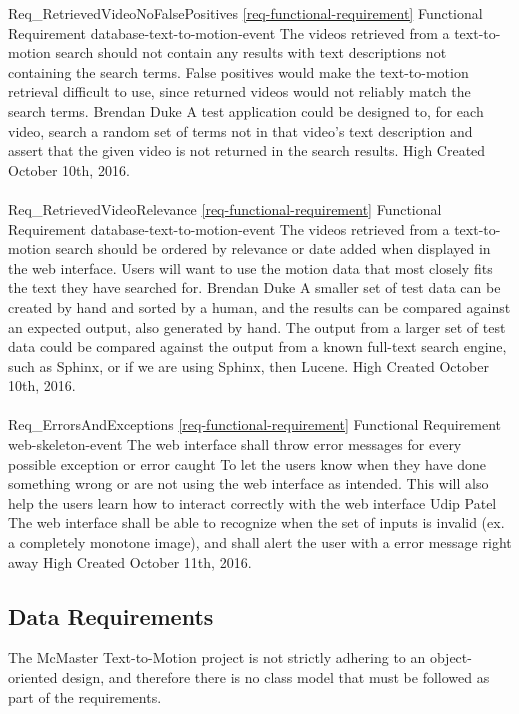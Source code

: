 \documentclass{scrreprt}
\begin{document}
\requirement
{Req_RetrievedVideoNoFalsePositives}
{\ref{req-functional-requirement} Functional Requirement}
{database-text-to-motion-event}
{The videos retrieved from a text-to-motion search should not contain any
 results with text descriptions not containing the search terms.}
{False positives would make the text-to-motion retrieval difficult to use,
 since returned videos would not reliably match the search terms.}
{Brendan Duke}
{A test application could be designed to, for each video, search a random set
 of terms not in that video's text description and assert that the given video
 is not returned in the search results.}
{High}
{Created October 10th, 2016.}
\\ \\

\requirement
{Req_RetrievedVideoRelevance}
{\ref{req-functional-requirement} Functional Requirement}
{database-text-to-motion-event}
{The videos retrieved from a text-to-motion search should be ordered by relevance or date added when displayed in the web interface.}
{Users will want to use the motion data that most closely fits the text they
 have searched for.}
{Brendan Duke}
{A smaller set of test data can be created by hand and sorted by a human, and
 the results can be compared against an expected output, also generated by hand.
 The output from a larger set of test data could be compared against the output
 from a known full-text search engine, such as Sphinx, or if we are using
 Sphinx, then Lucene.}
{High}
{Created October 10th, 2016.}
\\ \\

\requirement
{Req_ErrorsAndExceptions}
{\ref{req-functional-requirement} Functional Requirement}
{web-skeleton-event}
{The web interface shall throw error messages for every possible exception or error caught}
{To let the users know when they have done something wrong or are not using the web interface as intended. This will also help the users learn how to interact correctly with the web interface}
{Udip Patel}
{The web interface shall be able to recognize when the set of inputs is invalid (ex. a completely monotone image), and shall alert the user with a error message right away}
{High}
{Created October 11th, 2016.}

\subsection{Data Requirements}

The McMaster Text-to-Motion project is not strictly adhering to an
object-oriented design, and therefore there is no class model that must be
followed as part of the requirements.
\end{document}
